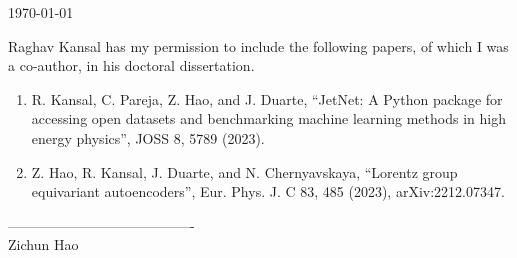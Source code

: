 \documentclass{article}
\begin{document}
\today

Raghav Kansal has my permission to include the following papers, of which
I was a co-author, in his doctoral dissertation.

\begin{enumerate}
    \item R. Kansal, C. Pareja, Z. Hao, and J. Duarte, “JetNet: A Python package for accessing open datasets and benchmarking machine learning methods in high energy physics”, JOSS 8, 5789 (2023).
    \item Z. Hao, R. Kansal, J. Duarte, and N. Chernyavskaya, “Lorentz group equivariant autoencoders”, Eur. Phys. J. C 83, 485 (2023), arXiv:2212.07347.
\end{enumerate}

\baselineskip
----------------------------------------\\
Zichun Hao
\end{document}
